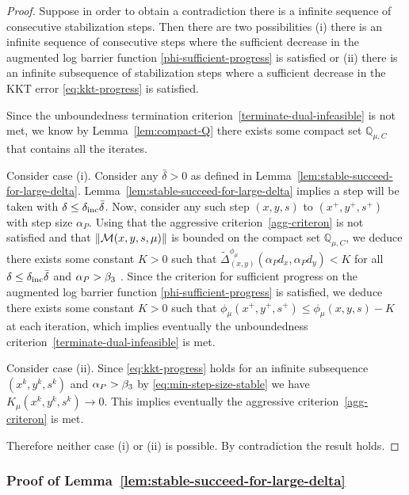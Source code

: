 \documentclass{article}
\begin{document}
\begin{proof}
Suppose in order to obtain a contradiction there is a infinite sequence of consecutive stabilization steps. Then there are two possibilities (i) there is an infinite sequence of consecutive steps where the sufficient decrease in the augmented log barrier function \eqref{phi-sufficient-progress} is satisfied or (ii) there is an infinite subsequence of stabilization steps where a sufficient decrease in the KKT error \eqref{eq:kkt-progress} is satisfied.

Since the unboundedness termination criterion~\eqref{terminate-dual-infeasible} is not met, we know by Lemma~\ref{lem:compact-Q} there exists some compact set $\mathbb{Q}_{\mu,C}$ that contains all the iterates.

Consider case (i). Consider any $\bar{\delta} > 0$ as defined in Lemma~\ref{lem:stable-succeed-for-large-delta}. Lemma~\ref{lem:stable-succeed-for-large-delta} implies a step will be taken with $\delta \le \delta_{\text{inc}} \bar{\delta}$. Now, consider any such step $(x,y,s)$ to $(x^{+}, y^{+}, s^{+})$ with step size $\alpha_{P}$. Using that the aggressive criterion~\eqref{agg-criteron} is not satisfied and that $\| \mathcal{M}(x,y,s, \mu) \|$ is bounded on the compact set $\mathbb{Q}_{\mu,C}$, we deduce there exists some constant $K > 0$ such that $\tilde{\Delta}^{\phi_{\mu}}_{(x,y)}(\alpha_{P} d_{x}, \alpha_{P} d_{y}) < K$ for all $\delta \le \delta_{\text{inc}} \bar{\delta}$ and $\alpha_{P} > \beta_{3}$ . Since the criterion for sufficient progress on the augmented log barrier function \eqref{phi-sufficient-progress} is satisfied, we deduce there exists some constant $K > 0$ such that $\phi_{\mu}(x^{+}, y^{+}, s^{+}) \le \phi_{\mu}(x, y, s) - K$ at each iteration, which implies eventually the unboundedness criterion~\eqref{terminate-dual-infeasible} is met. 

Consider case (ii). Since \eqref{eq:kkt-progress} holds for an infinite subsequence $(x^{k}, y^{k}, s^{k})$ and $\alpha_{P} > \beta_{3}$ by \eqref{eq:min-step-size-stable} we have $K_{\mu}(x^{k}, y^{k}, s^{k}) \rightarrow 0$. This implies eventually the aggressive criterion~\eqref{agg-criteron} is met.

Therefore neither case (i) or (ii) is possible. By contradiction the result holds.
\end{proof}


\subsubsection{Proof of Lemma~\ref{lem:stable-succeed-for-large-delta}}\label{sec:lem:stable-succeed-for-large-delta}
\end{document}
